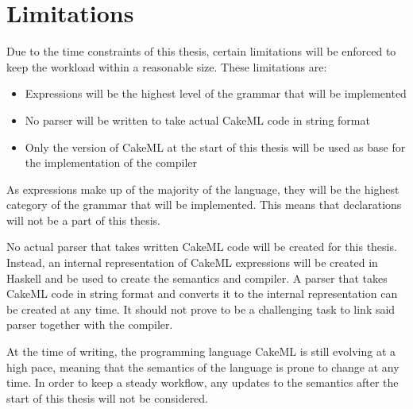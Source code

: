 \section{Limitations}
Due to the time constraints of this thesis, certain limitations will be enforced
to keep the workload within a reasonable size. These limitations are:

\begin{itemize}
\item Expressions will be the highest level of the grammar that will be implemented
\item No parser will be written to take actual CakeML code in string format
\item Only the version of CakeML at the start of this thesis will be used as base for the implementation of the compiler
\end{itemize}

As expressions make up of the majority of the language, they will be the highest
category of the grammar that will be implemented. This means that declarations
will not be a part of this thesis.

No actual parser that takes written CakeML code will be created for this thesis.
Instead, an internal representation of CakeML expressions will be created in
Haskell and be used to create the semantics and compiler. A parser that
takes CakeML code in string format and converts it to the internal
representation can be created at any time. It should not prove to be a
challenging task to link said parser together with the compiler.

At the time of writing, the programming language CakeML is still evolving at a
high pace, meaning that the semantics of the language is prone to change at
any time. In order to keep a steady workflow, any updates to the semantics after
the start of this thesis will not be considered.
